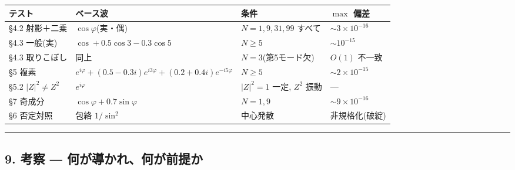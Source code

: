 \documentclass[
]{ltjsarticle}
\newcounter{none} %
\begin{document}
{\def\LTcaptype{none} %
\begin{longtable}[]{@{}
  >{\raggedright\arraybackslash}p{}
  >{\raggedright\arraybackslash}p{}
  >{\raggedright\arraybackslash}p{}
  >{\raggedright\arraybackslash}p{}@{}}
\toprule\noalign{}
\begin{minipage}[b]{\linewidth}\raggedright
テスト
\end{minipage} & \begin{minipage}[b]{\linewidth}\raggedright
ベース波
\end{minipage} & \begin{minipage}[b]{\linewidth}\raggedright
条件
\end{minipage} & \begin{minipage}[b]{\linewidth}\raggedright
\(\max\) 偏差
\end{minipage} \\
\midrule\noalign{}
\endhead
\bottomrule\noalign{}
\endlastfoot
§4.2 射影＋二乗 & \(\cos\varphi\)(実・偶) & \(N=1,9,31,99\) すべて &
\(\sim3\times10^{-16}\) \\
§4.3 一般(実) & \(\cos+0.5\cos3-0.3\cos5\) & \(N\ge5\) &
\(\sim10^{-15}\) \\
§4.3 取りこぼし & 同上 & \(N=3\)(第5モード欠) & \(O(1)\) 不一致 \\
§5 複素 &
\(e^{i\varphi}+(0.5{-}0.3i)e^{i3\varphi}+(0.2{+}0.4i)e^{-i5\varphi}\) &
\(N\ge5\) & \(\sim2\times10^{-15}\) \\
§5.2 \(|Z|^2\ne Z^2\) & \(e^{i\varphi}\) & \(|Z|^2{=}1\) 一定, \(Z^2\)
振動 & --- \\
§7 奇成分 & \(\cos\varphi+0.7\sin\varphi\) & \(N=1,9\) &
\(\sim9\times10^{-16}\) \\
§6 否定対照 & 包絡 \(1/\sin^2\) & 中心発散 & 非規格化(破綻) \\
\end{longtable}
}

\begin{center}\rule{0.5\linewidth}{0.5pt}\end{center}

\subsection{9. 考察 ―
何が導かれ、何が前提か}\label{ux8003ux5bdf-ux4f55ux304cux5c0eux304bux308cux4f55ux304cux524dux63d0ux304b}
\end{document}
